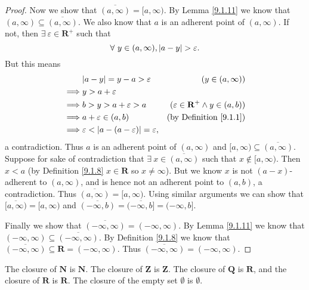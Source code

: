 \begin{proof}
    Now we show that \(\overline{(a, \infty)} = [a, \infty)\).
    By Lemma \ref{9.1.11} we know that \((a, \infty) \subseteq \overline{(a, \infty)}\).
    We also know that \(a\) is an adherent point of \((a, \infty)\).
    If not, then \(\exists\ \varepsilon \in \mathbf{R}^+\) such that
    \[
        \forall\ y \in (a, \infty), \abs*{a - y} > \varepsilon.
    \]
    But this means
    \begin{align}
                 & \abs*{a - y} = y - a > \varepsilon                        & (y \in (a, \infty))                               \\
        \implies & y > a + \varepsilon                                                                                           \\
        \implies & b > y > a + \varepsilon > a                               & (\varepsilon \in \mathbf{R}^+ \land y \in (a, b)) \\
        \implies & a + \varepsilon \in (a, b)                                & \text{(by Definition \ref{9.1.1})}                \\
        \implies & \varepsilon < \abs*{a - (a - \varepsilon)} = \varepsilon,
    \end{align}
    a contradiction.
    Thus \(a\) is an adherent point of \((a, \infty)\) and \([a, \infty) \subseteq \overline{(a, \infty)}\).
    Suppose for sake of contradiction that \(\exists\ x \in \overline{(a, \infty)}\) such that \(x \notin [a, \infty)\).
    Then \(x < a\) (by Definition \ref{9.1.8} \(x \in \mathbf{R}\) so \(x \neq \infty\)).
    But we know \(x\) is not \((a - x)\)-adherent to \((a, \infty)\), and is hence not an adherent point to \((a, b)\), a contradiction.
    Thus \(\overline{(a, \infty)} = [a, \infty)\).
    Using similar arguments we can show that \(\overline{[a, \infty)} = [a, \infty)\) and \(\overline{(-\infty, b)} = \overline{(-\infty, b]} = (-\infty, b]\).

    Finally we show that \(\overline{(-\infty, \infty)} = (-\infty, \infty)\).
    By Lemma \ref{9.1.11} we know that \((-\infty, \infty) \subseteq \overline{(-\infty, \infty)}\).
    By Definition \ref{9.1.8} we know that \(\overline{(-\infty, \infty)} \subseteq \mathbf{R} = (-\infty, \infty)\).
    Thus \(\overline{(-\infty, \infty)} = (-\infty, \infty)\).
\end{proof}

\begin{lemma}\label{9.1.13}
    The closure of \(\mathbf{N}\) is \(\mathbf{N}\).
    The closure of \(\mathbf{Z}\) is \(\mathbf{Z}\).
    The closure of \(\mathbf{Q}\) is \(\mathbf{R}\), and the closure of \(\mathbf{R}\) is \(\mathbf{R}\).
    The closure of the empty set \(\emptyset\) is \(\emptyset\).
\end{lemma}


